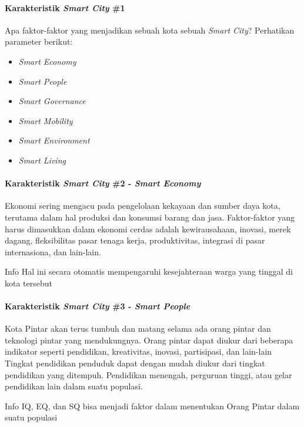 \begin{frame}{\insertsectionhead}
	\framesubtitle{Karakteristik \textit{Smart City} \#1}
	\justifying
	Apa faktor-faktor yang menjadikan sebuah kota sebuah \textit{Smart City}? Perhatikan parameter berikut:
	\vfill
	\begin{itemize}
		\item \textit{Smart Economy}
		\item \textit{Smart People}
		\item \textit{Smart Governance}
		\item \textit{Smart Mobility}
		\item \textit{Smart Environment}
		\item \textit{Smart Living}
	\end{itemize}
\end{frame}

\begin{frame}{\insertsectionhead}
	\framesubtitle{Karakteristik \textit{Smart City} \#2 - \textit{Smart Economy}}
	\justifying
	Ekonomi sering mengacu pada pengelolaan kekayaan dan sumber daya kota, terutama dalam hal produksi dan konsumsi barang dan jasa. Faktor-faktor yang harus dimasukkan dalam ekonomi cerdas adalah kewirausahaan, inovasi, merek dagang, fleksibilitas pasar tenaga kerja, produktivitas, integrasi di pasar internasiona, dan lain-lain.
	\vfill
	\begin{block}{Info}
		Hal ini secara otomatis mempengaruhi kesejahteraan warga yang tinggal di kota tersebut
	\end{block}	
\end{frame}

\begin{frame}{\insertsectionhead}
	\framesubtitle{Karakteristik \textit{Smart City} \#3 - \textit{Smart People}}
	\justifying
	Kota Pintar akan terus tumbuh dan matang selama ada orang pintar dan teknologi pintar yang mendukungnya. Orang pintar dapat diukur dari beberapa indikator seperti pendidikan, kreativitas, inovasi, partisipasi, dan lain-lain
	\vfill 
	Tingkat pendidikan penduduk dapat dengan mudah diukur dari tingkat pendidikan yang ditempuh. Pendidikan menengah, perguruan tinggi, atau gelar pendidikan lain dalam suatu populasi.
	\vfill
	\begin{block}{Info}
		IQ, EQ, dan SQ bisa menjadi faktor dalam menentukan Orang Pintar dalam suatu populasi
	\end{block}
\end{frame}


